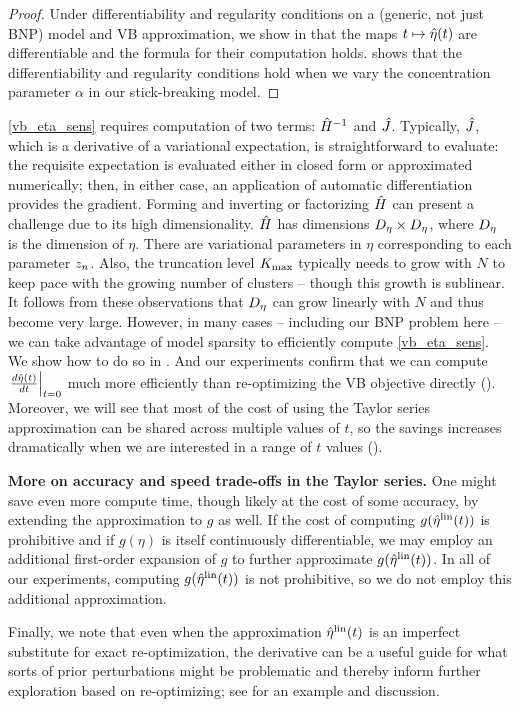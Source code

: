 %
\begin{proof}
%
Under differentiability and regularity conditions on a (generic, not just BNP)
model and VB approximation, we show in  that the maps $t
\mapsto \hat\eta(t)$ are differentiable and the formula for their computation
holds.  shows that the differentiability and
regularity conditions hold when we vary the concentration parameter $\alpha$ in
our stick-breaking model.
%
\end{proof}
%

\eqref{vb_eta_sens} requires computation of two terms: $\hat{H}^{-1}$ and
$\hat J$.  Typically, $\hat J$, which is a derivative of a
variational expectation, is straightforward to evaluate: the requisite
expectation is evaluated either in closed form or approximated numerically;
then, in either case, an application of automatic differentiation provides the
gradient. Forming and inverting or factorizing $\hat{H}$ can present a
challenge due to its high dimensionality. $\hat{H}$ has dimensions ${D_{\eta}}
\times {D_{\eta}}$, where ${D_{\eta}}$ is the dimension of $\eta$. There are
variational parameters in $\eta$ corresponding to each parameter $z_n$. Also,
the truncation level ${K_{\mathrm{max}}}$ typically needs to grow with $N$ to keep pace with
the growing number of clusters -- though this growth is sublinear. It follows
from these observations that ${D_{\eta}}$ can grow linearly with $N$ and thus
become very large.  However, in many cases -- including our BNP problem here --
we can take advantage of model sparsity to efficiently compute
\eqref{vb_eta_sens}. We show how to do so in . And
our experiments confirm that we can compute $\left.\frac{d \hat\eta(t)}{d t}\right\vert_{t=0}$
much more efficiently than re-optimizing the VB objective directly
(). Moreover, we will see that most of the cost of using
the Taylor series approximation can be shared across multiple values of $t$, so
the savings increases dramatically when we are interested in a range of $t$
values ().

\noindent \textbf{More on accuracy and speed trade-offs in the Taylor series.}
One might save even more compute time, though likely at the cost of some
accuracy, by extending the approximation to $g$ as well. If the cost of
computing $g(\hat\eta^{\mathrm{lin}}(t))$ is prohibitive and if $g(\eta)$ is itself continuously
differentiable, we may employ an additional first-order expansion of $g$ to
further approximate $g(\hat\eta^{\mathrm{lin}}(t))$. In all of our experiments, computing
$g(\hat\eta^{\mathrm{lin}}(t))$ is not prohibitive, so we do not employ this additional
approximation.

Finally, we note that even when the approximation $\hat\eta^{\mathrm{lin}}(t)$ is an imperfect
substitute for exact re-optimization, the derivative can be a useful guide for
what sorts of prior perturbations might be problematic and thereby inform
further exploration based on re-optimizing; see  for
an example and discussion.
